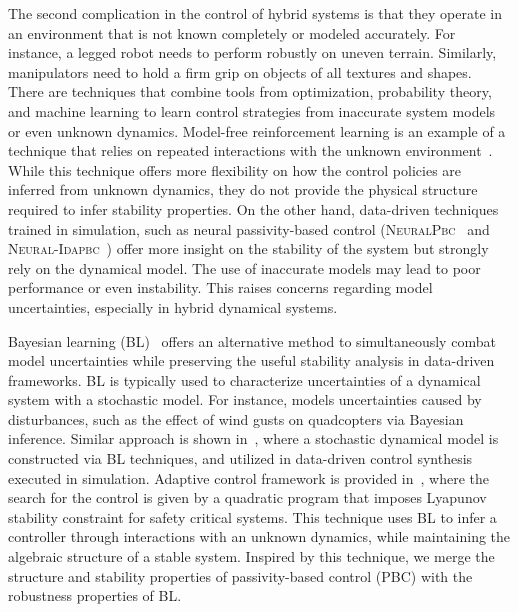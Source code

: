 The second complication in the control of hybrid systems is that they operate in
an environment that is not known completely or modeled accurately.
%
For instance, a legged robot needs to perform robustly on uneven terrain.
Similarly, manipulators need to hold a firm grip on objects of all textures and
shapes.
%
There are techniques that combine tools from optimization, probability theory,
and machine learning to learn control strategies from inaccurate system models
or even unknown dynamics.
%
Model-free reinforcement learning is an example of a technique that relies on
repeated interactions with the unknown
environment~\cite{heess2017emergence,andrychowicz2020learning,lillicrap2015continuous}.
%
While this technique offers more flexibility on how the control policies are
inferred from unknown dynamics, they do not provide the physical structure
required to infer stability properties.
%
On the other hand, data-driven techniques trained in simulation, such as neural
passivity-based control (\textsc{NeuralPbc}~\cite{neuralpbc} and
\textsc{Neural-Idapbc}~\cite{neuralidapbc}) offer more insight on the stability
of the system but strongly rely on the dynamical model.
%
The use of inaccurate models may lead to poor performance or even instability.
%
This raises concerns regarding model uncertainties, especially in hybrid dynamical
systems.
%

Bayesian learning (BL)~\cite{gal2016improving,thakur} offers an alternative
method to simultaneously combat model uncertainties while preserving the useful
stability analysis in data-driven frameworks.
%
BL is typically used to characterize uncertainties of a dynamical system with a
stochastic model.
%
For instance, \cite{sadigh2015safe} models uncertainties caused by disturbances,
such as the effect of wind gusts on quadcopters via Bayesian inference.
%
Similar approach is shown in~\cite{shen2022online, pmlr-v54-linderman17a}, where
a stochastic dynamical model is constructed via BL techniques, and utilized in
data-driven control synthesis executed in simulation. 
%
%
%
Adaptive control framework is provided in~\cite{fan2020bayesian}, where the
search for the control is given by a quadratic program that imposes
Lyapunov stability constraint for safety critical systems.
%
This technique uses BL to infer a controller through interactions with an
unknown dynamics, while maintaining the algebraic structure of a stable system.
%
Inspired by this technique, we merge the structure and stability properties of
passivity-based control (PBC) with the robustness properties of BL.  


